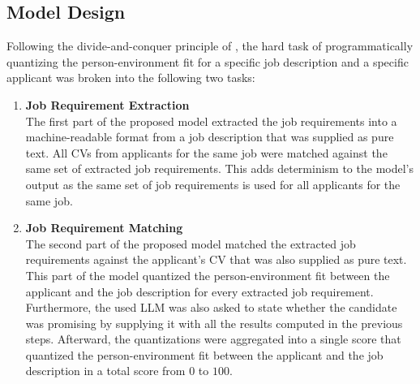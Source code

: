 \documentclass[draft,final]{thesisclass} %
\begin{document}
\subsection{Model Design}
Following the divide-and-conquer principle of \textcite{pj_fit_ml}, the hard task of programmatically quantizing the person-environment fit for a specific job description and a specific applicant was broken into the following two tasks:
\begin{enumerate}
    \item \textbf{Job Requirement Extraction}\\
    The first part of the proposed model extracted the job requirements into a machine-readable format from a job description that was supplied as pure text.
    All \acs{CV}s from applicants for the same job were matched against the same set of extracted job requirements.
    This adds determinism to the model's output as the same set of job requirements is used for all applicants for the same job.
    \item \textbf{Job Requirement Matching}\\
    The second part of the proposed model matched the extracted job requirements against the applicant's \acs{CV} that was also supplied as pure text.
    This part of the model quantized the person-environment fit between the applicant and the job description for every extracted job requirement.
    Furthermore, the used \acs{LLM} was also asked to state whether the candidate was promising by supplying it with all the results computed in the previous steps.
    Afterward, the quantizations were aggregated into a single score that quantized the person-environment fit between the applicant and the job description in a total score from $0$ to $100$.
\end{enumerate}
\end{document}

